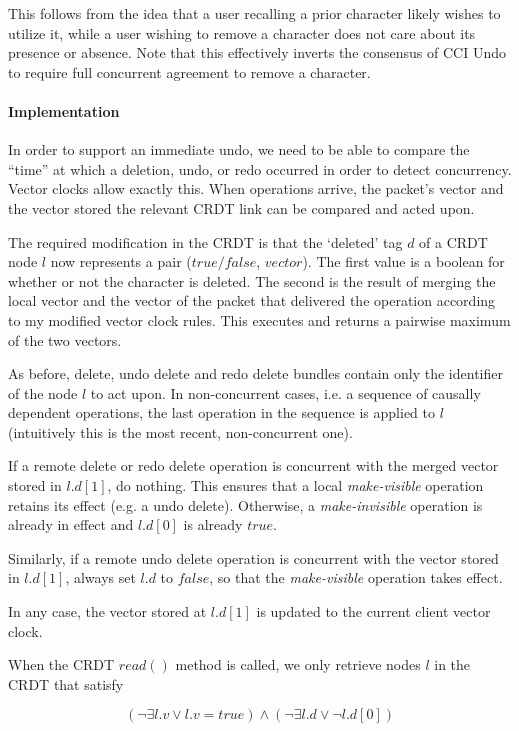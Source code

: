 \documentclass[12pt,a4paper,twoside,openright]{report}
\begin{document}
			This follows from the idea that a user recalling a prior character likely wishes to utilize it, while a user wishing to remove a character does not care about its presence or absence. Note that this effectively inverts the consensus of CCI Undo to require full concurrent agreement to remove a character. 
			
			\paragraph{Implementation}
			In order to support an immediate undo, we need to be able to compare the ``time'' at which a deletion, undo, or redo occurred in order to detect concurrency. Vector clocks allow exactly this. When operations arrive, the packet's vector and the vector stored the relevant CRDT link can be compared and acted upon.
			
			The required modification in the CRDT is that the `deleted' tag $d$ of a CRDT node $l$ now represents a pair ($true/false$, $vector$). The first value is a boolean for whether or not the character is deleted. The second is the result of merging the local vector and the vector of the packet that delivered the operation according to my modified vector clock rules. This executes and returns a pairwise maximum of the two vectors.
			
			As before, delete, undo delete and redo delete bundles contain only the identifier of the node $l$ to act upon. In non-concurrent cases, i.e. a sequence of causally dependent operations, the last operation in the sequence is applied to $l$ (intuitively this is the most recent, non-concurrent one). 
			
			If a remote delete or redo delete operation is concurrent with the merged vector stored in $l.d[1]$, do nothing. This ensures that a local \textit{make-visible} operation retains its effect (e.g. a undo delete). Otherwise, a \textit{make-invisible} operation is already in effect and $l.d[0]$ is already $true$.
			
			Similarly, if a remote undo delete operation is concurrent with the vector stored in $l.d[1]$, always set $l.d$ to $false$, so that the \textit{make-visible} operation takes effect.
			
			In any case, the vector stored at $l.d[1]$ is updated to the current client vector clock.
			
			When the CRDT $read()$ method is called, we only retrieve nodes $l$ in the CRDT that satisfy
			
					\[(\lnot\exists l.v \lor l.v = true) \land (\lnot\exists l.d \lor \lnot l.d[0]) \] 
						
\end{document}
